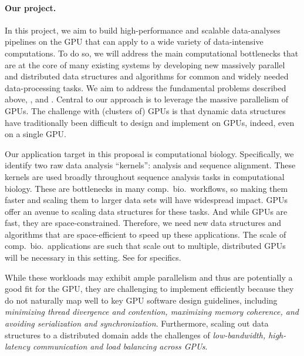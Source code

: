 %

\paragraph{Our project.} In this project, we aim to build high-performance and scalable
data-analyses pipelines on the GPU that can apply to a wide variety of data-intensive
computations.  To do so, we will address the main computational
bottlenecks that are at the core of many existing systems by developing new
massively parallel and distributed data structures and algorithms for common
and widely needed data-processing tasks. We aim to address the fundamental
problems described above, , and .
%
%
Central to our approach is to leverage the massive parallelism of GPUs. The
challenge with (clusters of) GPUs  is that dynamic data structures have
traditionally  been difficult to design and implement on GPUs, indeed, even on
a single GPU\@.

Our application target in this proposal is computational biology.
Specifically, we identify two raw data analysis ``kernels'':
\Kmer analysis and sequence alignment. These kernels are used broadly
throughout sequence analysis tasks in computational biology. These are bottlenecks in many
comp.~bio.~workflows, so making them faster and scaling them to larger data
sets will have widespread impact. GPUs offer an avenue to scaling data
structures for these tasks. And while GPUs are fast, they are space-constrained.  Therefore,
we need new data structures and algorithms that are space-efficient to speed up
these applications. The scale of comp.~bio.~applications are such that scale
out to multiple, distributed GPUs will be necessary in this setting. See
 for specifics.

 While these workloads may exhibit ample parallelism and thus are potentially a
good fit for the GPU, they are challenging to implement efficiently because
they do not naturally map well to key GPU software design guidelines, including
\emph{minimizing thread divergence and contention, maximizing memory coherence,
and avoiding serialization and synchronization}. Furthermore, scaling out data
structures to a distributed domain adds the challenges of \emph{low-bandwidth,
high-latency communication and load balancing across GPUs}.

